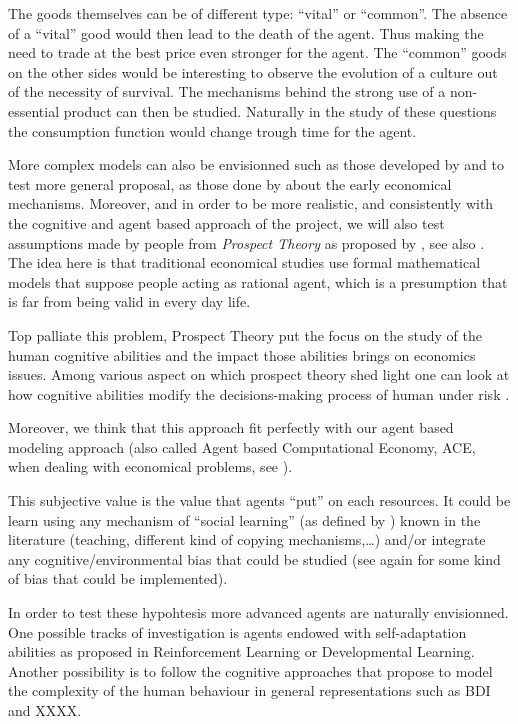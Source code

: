 \documentclass{wscpaperproc}
\begin{document}
The goods themselves can be of different type: ``vital'' or ``common''. The absence of a ``vital'' good would then lead to the death of the agent. Thus making the need to trade at the best price even stronger for the agent. The ``common'' goods on the other sides would be interesting to observe the evolution of a culture out of the necessity of survival. The mechanisms behind the strong use of a non-essential product can then be studied. Naturally in the study of these questions the consumption function would change trough time for the agent.

More complex models can also be envisionned such as those developed by 
\cite{rubinstein_equilibrium_1985} and to test more general proposal, as those done by \cite{polanyi_trade_1957,polanyi_livelihood_1977} about the early economical mechanisms. Moreover, and in order to be more realistic, and consistently with the cognitive and agent based approach of the project, we will also test assumptions made by people from \emph{Prospect Theory} as proposed by 
\cite{kahneman_prospect_1979}, see also
\cite{camerer_prospect_2004}. The idea here is that traditional economical studies use formal mathematical models that suppose people acting as rational agent, which is a presumption that is far from being valid  in every day life. 

Top palliate this problem, Prospect Theory put the focus on the study of the human cognitive abilities and the impact those abilities brings on economics issues. Among various aspect on which prospect theory shed light one can look at how cognitive abilities modify the decisions-making process of human under risk
\cite{weber_disposition_1998}.

Moreover, we think that this approach fit perfectly with our agent based modeling approach (also called Agent based Computational Economy, ACE, when dealing with economical problems, see
\cite{tesfatsion_introduction_2001}).


This subjective value is the value that agents ``put'' on each resources. It could be learn using any mechanism of ``social learning'' (as defined by \cite{lycett_cultural_2015}) known in the literature (teaching, different kind of copying mechanisms,\ldots) and/or integrate any cognitive/environmental bias that could be studied (see again \cite{lycett_cultural_2015} for some kind of bias that could be implemented).

In order to test these hypohtesis more advanced agents are naturally envisionned. One possible tracks of investigation is agents endowed with self-adaptation abilities as proposed in Reinforcement Learning or Developmental Learning. Another possibility is to follow the cognitive approaches that propose to model the complexity of the human behaviour in general representations such as BDI and XXXX.



  
\end{document}
